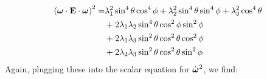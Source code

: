 \documentclass[extra,mreferee]{gji}
\begin{document}
\begin{equation}
\begin{aligned}
\left(\mitbf{\omega} \cdot \mathbf{E} \cdot \mitbf{\omega} \right)^2 =  
&\lambda_1^2 \sin^4{\theta} \cos^4{\phi} + 
\lambda_2^2 \sin^4{\theta} \sin^4{\phi} +
\lambda_3^2 \cos^4{\theta} \\
&+ 2 \lambda_1 \lambda_2 \sin^4{\theta} \cos^2{\phi}\sin^2{\phi} \\ 
&+ 2 \lambda_1 \lambda_3 \sin^2{\theta} \cos^2{\theta} \cos^2{\phi} \\
&+ 2 \lambda_2 \lambda_3 \sin^2{\theta} \cos^2{\theta} \sin^2{\phi} \\ 
\end{aligned}
\end{equation}
Again, plugging these into the scalar equation for $\dot{\mitbf{\omega}}^2$, we find:
\end{document}
